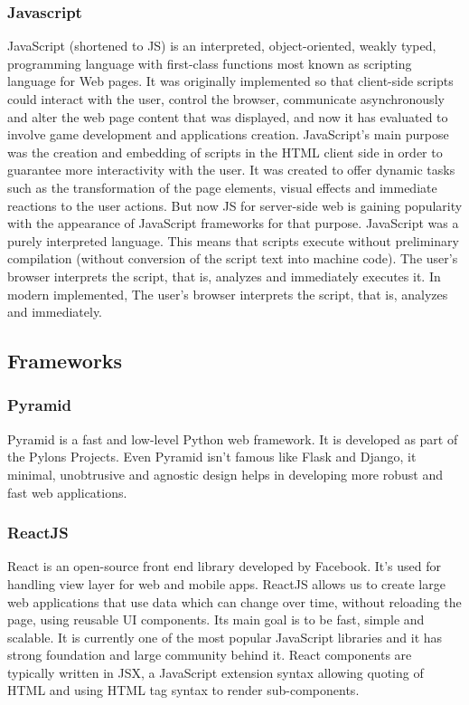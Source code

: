 \subsubsection{Javascript}
JavaScript (shortened to JS) is an interpreted, object-oriented, weakly typed,
programming language with first-class functions most known as scripting language
for Web pages. It was originally implemented so that client-side scripts could
interact with the user, control the browser, communicate asynchronously and
alter the web page content that was displayed, and now it has evaluated to
involve game  development and applications creation. JavaScript's main purpose
was the creation and embedding of scripts in the HTML client side in order to
guarantee more interactivity with the user. It was created to offer dynamic
tasks such as the transformation of the page elements, visual effects and
immediate reactions to the user actions. But now JS for server-side web is
gaining popularity with the appearance of JavaScript frameworks for that
purpose. 
JavaScript was a purely interpreted language. This means that scripts execute
without preliminary compilation (without conversion of the script text into
machine code). The user's browser interprets the script, that is, analyzes and
immediately executes it. In modern implemented, The user's browser interprets
the script, that is, analyzes and immediately. \cite{javascript}

\subsection{Frameworks}
\subsubsection{Pyramid}
Pyramid is a fast and low-level Python web framework. It is developed as
part of the Pylons Projects. Even Pyramid isn't famous like Flask and Django, it
minimal, unobtrusive and agnostic design helps in developing more robust and
fast web applications.

\subsubsection{ReactJS}
React is an open-source front end library developed by Facebook. It's used for
handling view layer for web and mobile apps. ReactJS allows us to create large
web applications that use data which can change over time, without reloading the
page, using reusable UI components. Its main goal is to be fast, simple and
scalable. It is currently one of the most popular JavaScript libraries and it
has strong foundation and large community behind it. React components are
typically written in JSX, a JavaScript extension syntax allowing quoting of HTML
and using HTML tag syntax to render sub-components.

